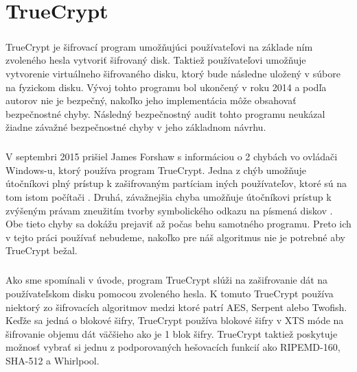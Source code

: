 \chapter{TrueCrypt}
\paragraph{}
TrueCrypt je šifrovací program umožňujúci používateľovi na základe ním zvoleného hesla vytvoriť šifrovaný disk. Taktiež používateľovi umožňuje vytvorenie virtuálneho šifrovaného disku, ktorý bude následne uložený v súbore na fyzickom disku. Vývoj tohto programu bol ukončený v roku 2014 a podľa autorov nie je bezpečný, nakoľko jeho implementácia môže obsahovať bezpečnostné chyby. Následný bezpečnostný audit tohto programu neukázal žiadne závažné bezpečnostné chyby v jeho základnom návrhu. 

\paragraph{}
V septembri 2015 prišiel James Forshaw s informáciou o 2 chybách vo ovládači Windows-u, ktorý používa program TrueCrypt. Jedna z chýb umožňuje útočníkovi plný prístup k zašifrovaným partíciam iných používateľov, ktoré sú na tom istom počítači \cite{issue1}. Druhá, závažnejšia chyba umožňuje útočníkovi prístup k zvýšeným právam zneužitím tvorby symbolického odkazu na písmená diskov \cite{issue2}. Obe tieto chyby sa dokážu prejaviť až počas behu samotného programu. Preto ich v tejto práci používať nebudeme, nakoľko pre náš algoritmus nie je potrebné aby TrueCrypt bežal.

\paragraph{}
Ako sme spomínali v úvode, program TrueCrypt slúži na zašifrovanie dát na používateľskom disku pomocou zvoleného hesla. K tomuto TrueCrypt používa niektorý zo šifrovacích algoritmov medzi ktoré patrí AES, Serpent alebo Twofish. Keďže sa jedná o blokové šifry, TrueCrypt používa blokové šifry v XTS móde na šifrovanie objemu dát väčšieho ako je 1 blok šifry. TrueCrypt taktiež poskytuje možnosť vybrať si jednu z podporovaných hešovacích funkcií ako RIPEMD-160, SHA-512 a Whirlpool.

